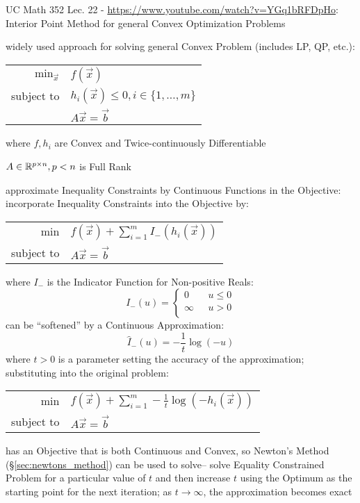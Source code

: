 \asterism

UC Math 352 Lec. 22 - \url{https://www.youtube.com/watch?v=YGq1bRFDpHo}:
Interior Point Method for general Convex Optimization Problems

widely used approach for solving general Convex Problem (includes LP, QP,
etc.):

\begin{tabular}{r l}
  $\mathrm{min}_{\vec{x}}$ & $f(\vec{x})$     \\
  subject to               & $h_i(\vec{x}) \leq 0, i \in \{1,\ldots,m\}$ \\
                           & $A\vec{x} = \vec{b}$   \\
\end{tabular}

where $f, h_i$ are Convex and Twice-continuously Differentiable

$A \in \mathbb{R}^{p \times n}, p < n$ is Full Rank

approximate Inequality Constraints by Continuous Functions in the Objective:
incorporate Inequality Constraints into the Objective by:

\begin{tabular}{r l}
  $\mathrm{min}$ & $f(\vec{x}) + \sum_{i=1}^m I_{-} (h_i(\vec{x}))$ \\
  subject to     & $A\vec{x} = \vec{b}$ \\
\end{tabular}

where $I_{-}$ is the Indicator Function for Non-positive Reals:
\[
  I_{-}(u) = \begin{cases}
    0       & \ \ \ u \leq 0 \\
    \infty  & \ \ \ u >    0 \\
  \end{cases}
\]
can be ``softened'' by a Continuous Approximation:
\[
  \hat{I}_{-}(u) = -\frac{1}{t} \log (-u)
\]
where $t > 0$ is a parameter setting the accuracy of the approximation;
substituting into the original problem:

\begin{tabular}{r l}
  $\mathrm{min}$ &
    $f(\vec{x}) + \sum_{i=1}^m -\frac{1}{t} \log(-h_i(\vec{x}))$ \\
  subject to     & $A\vec{x} = \vec{b}$ \\
\end{tabular}

has an Objective that is both Continuous and Convex, so Newton's Method
(\S\ref{sec:newtons_method}) can be used to solve-- solve Equality Constrained
Problem for a particular value of $t$ and then increase $t$ using the Optimum
as the starting point for the next iteration; as $t \rightarrow \infty$, the
approximation becomes exact

